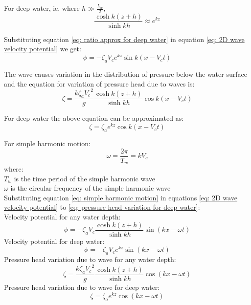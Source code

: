 For deep water, ie. where $h \gg \frac{L_w}{2}$, 
\begin{equation}
  \frac{\cosh k(z + h)}{\sinh k h} \approx e^{k z}
  \label{eq: ratio approx for deep water}
\end{equation}

Substituting equation \ref{eq: ratio approx for deep water} in equation 
\ref{eq: 2D wave velocity potential} we get:
\begin{equation}
  \phi = - \zeta_a V_c e^{k z} \sin k(x - V_c t)
  \label{eq: 2D wave velocity potential for deep water}
\end{equation}

The wave causes variation in the distribution of pressure below the water
surface and the equation for variation of pressure head due to waves is:
\begin{equation}
  \zeta = \frac{k \zeta_a {V_c}^2}{g} \frac{\cosh k(z + h)}{\sinh k h} \cos k(x
  - V_c t)
  \label{eq: pressure head variation}
\end{equation}

For deep water the above equation can be approximated as:
\begin{equation}
  \zeta = \zeta_a e^{k z} \cos k(x - V_c t)
  \label{eq: pressure head variation for deep water}
\end{equation}

For simple harmonic motion: 
\begin{equation}
  \omega = \frac{2 \pi}{T_w} = k V_c
  \label{eq: simple harmonic motion}
\end{equation}
where: \\
$T_w$ is the time period of the simple harmonic wave\\
$\omega$ is the circular frequency of the simple harmonic wave\\

Substituting equation \ref{eq: simple harmonic motion} in equations  
\ref{eq: 2D wave velocity potential} to
\ref{eq: pressure head variation for deep water}:\\
Velocity potential for any water depth: 
\begin{equation}
  \phi = - \zeta_a V_c \frac{\cosh k(z + h)}{\sinh k h} \sin (kx - \omega t)
  \label {eq: 2D wave velocity potential wrt frequency}
\end{equation}
Velocity potential for deep water: 
\begin{equation}
  \phi = - \zeta_a V_c e^{k z} \sin (k x - \omega t)
  \label {eq: 2D wave velocity potential wrt frequency deep water}
\end{equation}
Pressure head variation due to wave for any water depth:
\begin{equation}
  \zeta = \frac{k \zeta_a {V_c}^2}{g} \frac{\cosh k(z + h)}{\sinh kh} \cos (kx
  - \omega t)
  \label{eq: pressure head variation wrt frequency}
\end{equation}
Pressure head variation due to wave for deep water:
\begin{equation}
  \zeta = \zeta_a e^{k z} \cos (k x - \omega t)
  \label{eq: pressure head variation wrt frequency deep water}
\end{equation}

